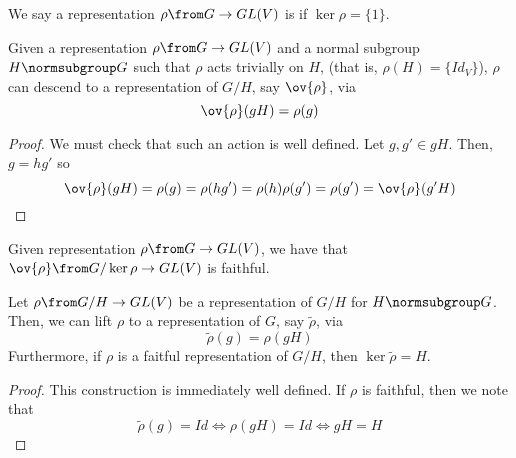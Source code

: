 \documentclass[11pt,leqno,oneside]{amsbook}
\numberwithin{thm}{section}
\begin{document}
\begin{defn}
  We say a representation \(\rho \from G \to GL(V)\) is 
  if \(\ker \rho = \{1\}\).
\end{defn}
\begin{prop}\label{quotient-rep}
  Given a representation \(\rho \from G \to GL(V)\) and a normal
  subgroup \(H \normsubgroup G\) such that \(\rho\) acts trivially on
  \(H\), (that is, \(\rho(H) = \{Id_V\}\)), \(\rho\) can descend to a
  representation of \(G/H\), say \(\ov{\rho}\), via \[
    \ov{\rho}(gH) = \rho(g)
  \]
\end{prop}
\begin{proof}
  We must check that such an action is well defined. Let \(g,g' \in
  gH\). Then, \(g = hg'\) so \[
    \ov{\rho}(gH) = \rho(g) = \rho(hg') = \rho(h)\rho(g') = \rho(g') = \ov{\rho}(g'H)
  \]
\end{proof}
\begin{prop}
  Given representation \(\rho \from G \to GL(V)\), we have that
  \(\ov{\rho} \from G/\ker \rho \to GL(V)\) is faithful.
\end{prop}
\begin{prop}\label{lifted-rep}
  Let \(\rho \from G/H \to GL(V)\) be a representation of \(G/H\) for \(H
  \normsubgroup G\). Then, we can lift \(\rho\) to a representation of
  \(G\), say \(\tilde{\rho}\), via \[
    \tilde{\rho}(g) = \rho(gH)
  \]
  Furthermore, if \(\rho\) is a faitful representation of \(G/H\), then
  \(\ker \tilde{\rho} = H\).
\end{prop}
\begin{proof}
  This construction is immediately well defined. If \(\rho\) is
  faithful, then we note that \[
    \tilde{\rho}(g) = Id \iff \rho(gH) = Id \iff gH = H
  \]
\end{proof}
\end{document}
